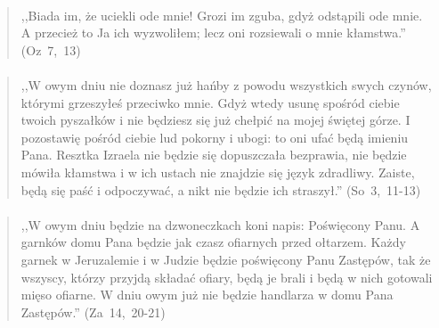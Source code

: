 \documentclass[10pt,a4paper,oneside]{article}
\begin{document}
\paragraph{}
\begin{quote}
,,Biada im, że uciekli ode mnie! Grozi im zguba, gdyż odstąpili ode mnie. A przecież to Ja ich wyzwoliłem; lecz oni rozsiewali o mnie kłamstwa.'' \mbox{(Oz 7, 13)}
\end{quote}
\paragraph{}
\begin{quote}
,,W owym dniu nie doznasz już hańby z powodu wszystkich swych czynów, którymi grzeszyłeś przeciwko mnie. Gdyż wtedy usunę spośród ciebie twoich pyszałków i nie będziesz się już chełpić na mojej świętej górze. I pozostawię pośród ciebie lud pokorny i ubogi: to oni ufać będą imieniu Pana. Resztka Izraela nie będzie się dopuszczała bezprawia, nie będzie mówiła kłamstwa i w ich ustach nie znajdzie się język zdradliwy. Zaiste, będą się paść i odpoczywać, a nikt nie będzie ich straszył.'' \mbox{(So 3, 11-13)}
\end{quote}
\paragraph{}
\begin{quote}
,,W owym dniu będzie na dzwoneczkach koni napis: Poświęcony Panu. A garnków domu Pana będzie jak czasz ofiarnych przed ołtarzem. Każdy garnek w Jeruzalemie i w Judzie będzie poświęcony Panu Zastępów, tak że wszyscy, którzy przyjdą składać ofiary, będą je brali i będą w nich gotowali mięso ofiarne. W dniu owym już nie będzie handlarza w domu Pana Zastępów.'' \mbox{(Za 14, 20-21)}
\end{quote}
\end{document}
